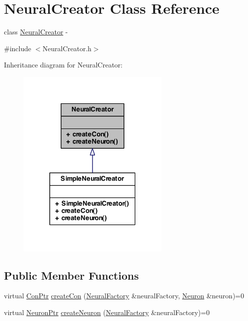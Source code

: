 \hypertarget{class_neural_creator}{
\section{NeuralCreator Class Reference}
\label{class_neural_creator}
}


class \hyperlink{class_neural_creator}{NeuralCreator} -\/  




{\ttfamily \#include $<$NeuralCreator.h$>$}



Inheritance diagram for NeuralCreator:
\nopagebreak
\begin{figure}[H]
\begin{center}
\leavevmode
\includegraphics[width=210pt]{class_neural_creator__inherit__graph}
\end{center}
\end{figure}
\subsection*{Public Member Functions}
\begin{DoxyCompactItemize}
\item 
virtual \hyperlink{_a_m_o_r_e_8h_a169bb8e5f26ce70bf2b10dec2fb5ee50}{ConPtr} \hyperlink{class_neural_creator_a9febc7917fd1264703d969cb3373eefc}{createCon} (\hyperlink{class_neural_factory}{NeuralFactory} \&neuralFactory, \hyperlink{class_neuron}{Neuron} \&neuron)=0
\item 
virtual \hyperlink{_a_m_o_r_e_8h_ac1ea936c2c7728eb382278131652fef4}{NeuronPtr} \hyperlink{class_neural_creator_a3ce00f2434e765fadcfc57b8d7c152e5}{createNeuron} (\hyperlink{class_neural_factory}{NeuralFactory} \&neuralFactory)=0
\end{DoxyCompactItemize}


